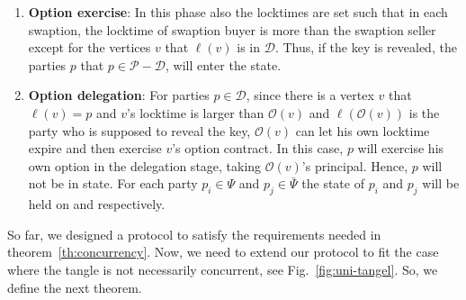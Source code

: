 \begin{enumerate}
    \item \textbf{Option exercise}: In this phase also the locktimes are set such that in each swaption, the locktime of swaption buyer is more than the swaption seller except for the vertices $v$ that $\ell(v)$ is in $\mathcal{D}$. Thus, if the \Atwo key is revealed, the parties $p$ that $p \in \mathcal{P} - \mathcal{D}$, will enter the \deal state.
    
    \item \textbf{Option delegation}: 
    For parties $p \in \mathcal{D}$, since there is a vertex $v$ that $\ell(v) = p$ and $v$'s locktime is larger than $\mathcal{O}(v)$ and $\ell(\mathcal{O}(v))$ is the party who is supposed to reveal the \Atwo key, $\mathcal{O}(v)$ can let his own locktime expire and then exercise $v$'s option contract. In this case, $p$ will exercise his own option in the delegation stage, taking $\mathcal{O}(v)$'s principal. Hence, $p$ will not be in \underwater state. For each party $p_i \in \Psi$ and $p_j \in \bar{\Psi}$ the state of $p_i$ and $p_j$ will be held on \deal and \freeride respectively.

\end{enumerate}



So far, we designed a protocol to satisfy the requirements needed in theorem~\ref{th:concurrency}. Now, we need to extend our protocol to fit the case where the tangle is not necessarily concurrent, \eg see Fig.~\ref{fig:uni-tangel}. So, we define the next theorem.

